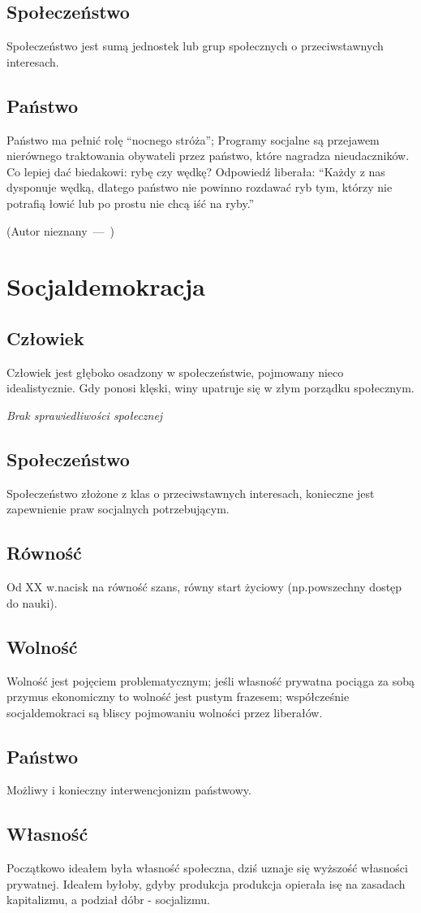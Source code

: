 \documentclass{article}
\let\oldquote\quote
\let\endoldquote\endquote
\renewenvironment{quote}[2][]
  {\if\relax\detokenize{#1}\relax
     \def\quoteauthor{#2}%
   \else
     \def\quoteauthor{#2~---~#1}%
   \fi
   \oldquote}
  {\par\nobreak\smallskip\hfill(\quoteauthor)%
   \endoldquote\addvspace{\bigskipamount}}
\begin{document}
\subsection{Społeczeństwo}
Społeczeństwo jest sumą jednostek lub grup społecznych o przeciwstawnych interesach.
\subsection{Państwo}
Państwo ma pełnić rolę ``nocnego stróża''; Programy socjalne są przejawem nierównego traktowania
obywateli przez państwo, które nagradza nieudaczników.
\begin{quote}{Autor nieznany}
    Co lepiej dać biedakowi: rybę czy wędkę?
    Odpowiedź liberała: ``Każdy z nas dysponuje wędką, dlatego państwo nie powinno rozdawać ryb tym,
    którzy nie potrafią łowić lub po prostu nie chcą iść na ryby.''
\end{quote}
\section{Socjaldemokracja}
\subsection{Człowiek}
Człowiek jest głęboko osadzony w społeczeństwie, pojmowany nieco idealistycznie. Gdy ponosi klęski,
winy upatruje się w złym porządku społecznym.

\emph{Brak sprawiedliwości społecznej}
\subsection{Społeczeństwo}
Społeczeństwo złożone z klas o przeciwstawnych interesach, konieczne jest zapewnienie praw socjalnych
potrzebującym.
\subsection{Równość}
Od XX w.\@ nacisk na równość szans, równy start życiowy (np.\@ powszechny dostęp do nauki).
\subsection{Wolność}
Wolność jest pojęciem problematycznym; jeśli własność prywatna pociąga za sobą przymus ekonomiczny
to wolność jest pustym frazesem; współcześnie socjaldemokraci są bliscy pojmowaniu wolności przez
liberałów.
\subsection{Państwo}
Możliwy i konieczny interwencjonizm państwowy.
\subsection{Własność}
Początkowo ideałem była własność społeczna, dziś uznaje się wyższość własności prywatnej. Ideałem
byłoby, gdyby produkcja produkcja opierała isę na zasadach kapitalizmu, a podział dóbr - socjalizmu.
\end{document}
